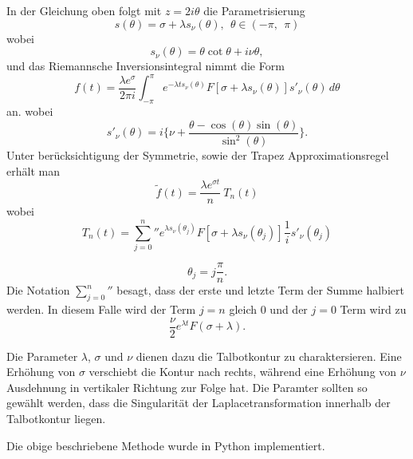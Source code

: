 In der Gleichung oben folgt mit $z=2i\theta$ die Parametrisierung
\[
s(\theta) = \sigma+\lambda s_{\nu}(\theta),~~ \theta\in (-\pi ,~~\pi)
\]
wobei
\[
s_{\nu}(\theta)=\theta \cot\theta+i\nu\theta,
\]
und das Riemannsche Inversionsintegral nimmt die Form 
\[
f(t)=\frac{\lambda e^{\sigma}}{2\pi i}\int_{-\pi}^{\pi} e^{-\lambda ts_{\nu}(\theta)}F[\sigma + \lambda s_{\nu}(\theta)]s'_{\nu}(\theta)\,d\theta
\]
an.
wobei
\[
s'_{\nu}(\theta) = i \Biggl\{\nu + \frac{\theta-\cos(\theta)\sin(\theta)}{\sin^{2}(\theta)}  \Biggr\}.
\]
Unter berücksichtigung der Symmetrie, sowie der Trapez Approximationsregel erhält man
\[
\tilde{f}(t) = \frac{\lambda e^{\sigma t}}{n}~T_{n}(t)
\]
wobei 
\[
T_{n}(t)
=
{\sum_{j=0}^n}'' e^{\lambda s_{\nu}(\theta_{j})}
F[\sigma + \lambda s_{\nu}(\theta_{j})]
\frac{1}{i} s'_{\nu}(\theta_{j})
\]

\[
\theta_{j} = j \frac{\pi}{n}.
\]
Die Notation ${\sum_{j=0}^n}''$ besagt, dass der erste und letzte
Term der Summe halbiert werden.
In diesem Falle wird der Term $j=n$ gleich 0 und der $j=0$ Term wird zu
\[
\frac{\nu}{2}e^{\lambda t}F(\sigma + \lambda).
\]

Die Parameter $\lambda$, $\sigma$ und $\nu$ dienen dazu die
Talbotkontur zu charaktersieren. Eine Erhöhung von $\sigma$ verschiebt
die Kontur nach rechts, während eine Erhöhung von $\nu$ Ausdehnung
in vertikaler Richtung zur Folge hat. Die Paramter sollten so gewählt
werden, dass die Singularität der Laplacetransformation innerhalb
der Talbotkontur liegen.

Die obige beschriebene Methode wurde in Python implementiert.

